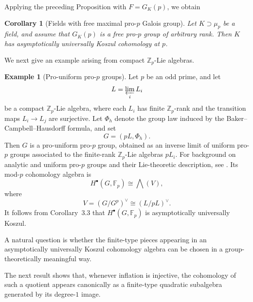 \documentclass[11pt]{amsart}
\numberwithin{equation}{section}
\newtheorem{corollary}[theorem]{Corollary}
\theoremstyle{definition}
\newtheorem{example}[theorem]{Example}
\begin{document}
	
	
	
	
	Applying the preceding Proposition with \(F=G_K(p)\), we obtain
	\begin{corollary}[Fields with free maximal pro-\(p\) Galois group]
		Let \(K\supset \mu_p\) be a field, and assume that \(G_K(p)\) is a free pro-\(p\) group of arbitrary rank. Then \(K\) has asymptotically universally Koszul cohomology at \(p\).
	\end{corollary}

We next give an example arising from compact $\mathbb Z_p$-Lie algebras.

\begin{example}[Pro-uniform pro-$p$ groups]
	Let $p$ be an odd prime, and let
	\[
	L=\varprojlim_i L_i
	\]
	be a compact $\mathbb Z_p$-Lie algebra, where each $L_i$ has finite $\mathbb Z_p$-rank and the transition maps $L_i\to L_j$ are surjective. Let $\Phi_h$ denote the group law induced by the Baker--Campbell--Hausdorff formula, and set
	\[
	G=(pL,\Phi_h).
	\]
	Then $G$ is a pro-uniform pro-$p$ group, obtained as an inverse limit of uniform pro-$p$ groups associated to the finite-rank $\mathbb Z_p$-Lie algebras $pL_i$. For background on analytic and uniform pro-$p$ groups and their Lie-theoretic description, see \cite{DixonDuSautoyMannSegal}. Its mod-$p$ cohomology algebra is
	\[
	H^\bullet(G,\mathbb F_p)\cong \bigwedge(V),
	\]
	where
	\[
	V=(G/G^p)^\vee \cong (L/pL)^\vee.
	\]
	It follows from Corollary~3.3 that $H^\bullet(G,\mathbb F_p)$ is asymptotically universally Koszul.
\end{example}
	
	
	A natural question is whether the finite-type pieces appearing in an asymptotically universally Koszul cohomology algebra can be chosen in a group-theoretically meaningful way.
	
	The next result shows that, whenever inflation is injective, the cohomology of such a quotient appears canonically as a finite-type quadratic subalgebra generated by its degree-\(1\) image. 
	
\end{document}
